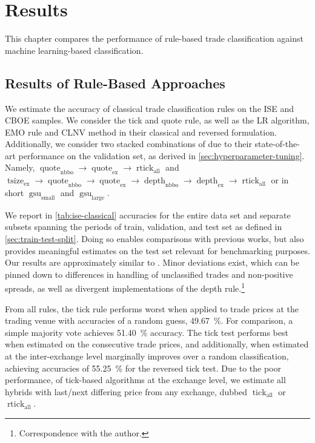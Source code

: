 \section{Results}\label{sec:results}

This chapter compares the performance of rule-based trade classification against machine learning-based classification. 

\subsection{Results of Rule-Based Approaches}\label{sec:result-of-rule-based-approaches}

We estimate the accuracy of classical trade classification rules on the \gls{ISE} and \gls{CBOE} samples. We consider the tick and quote rule, as well as the \gls{LR} algorithm, \gls{EMO} rule and \gls{CLNV} method in their classical and reversed formulation. Additionally, we consider two stacked combinations of \textcite[][12--14]{grauerOptionTradeClassification2022} due to their state-of-the-art performance on the validation set, as derived in \cref{sec:hyperparameter-tuning}. Namely, $\operatorname{quote}_{\mathrm{nbbo}} \to \operatorname{quote}_{\mathrm{ex}} \to \operatorname{rtick}_{\mathrm{all}}$ and $\operatorname{tsize}_{\mathrm{ex}} \to \operatorname{quote}_{\mathrm{nbbo}} \to \operatorname{quote}_{\mathrm{ex}} \to \operatorname{depth}_{\mathrm{nbbo}} \to \operatorname{depth}_{\mathrm{ex}} \to \operatorname{rtick}_{\mathrm{all}}$ or in short $\operatorname{gsu}_{\mathrm{small}}$ and $\operatorname{gsu}_{\mathrm{large}}$.

We report in \cref{tab:ise-classical} accuracies for the entire data set and separate subsets spanning the periods of train, validation, and test set as defined in \cref{sec:train-test-split}. Doing so enables comparisons with previous works, but also provides meaningful estimates on the test set relevant for benchmarking purposes. Our results are approximately similar to \textcite[][29--33]{grauerOptionTradeClassification2022}. Minor deviations exist, which can be pinned down to differences in handling of unclassified trades and non-positive spreads, as well as divergent implementations of the depth rule.\footnote{Correspondence with the author.}

From all rules, the tick rule performs worst when applied to trade prices at the trading venue with accuracies of a random guess, \SI{49.67}{\percent}. For comparison, a simple majority vote achieves \SI{51.40}{\percent} accuracy. The tick test performs best when estimated on the consecutive trade prices, and additionally, when estimated at the inter-exchange level marginally improves over a random classification, achieving accuracies of \SI{55.25}{\percent} for the reversed tick test. Due to the poor performance, of tick-based algorithms at the exchange level, we estimate all hybrids with last/next differing price from any exchange, dubbed $\operatorname{tick}_{\mathrm{all}}$ or $\operatorname{rtick}_{\mathrm{all}}$.

